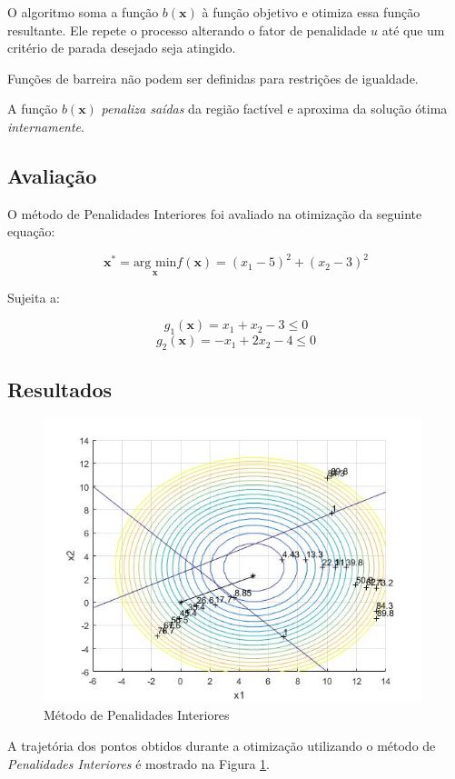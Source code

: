 \documentclass[10pt,a4paper]{article}
\begin{document}
	O algoritmo soma a função $b(\bm{x})$ à função objetivo e otimiza essa função resultante. Ele repete o processo alterando o fator de penalidade $u$ até que um critério de parada desejado seja atingido.

	Funções de barreira não podem ser definidas para restrições de igualdade.

	A função $b(\bm{x})$ \emph{penaliza saídas} da região factível e aproxima da solução ótima \emph{internamente}. 

	\subsection{Avaliação}

	O método de Penalidades Interiores foi avaliado na otimização da seguinte equação:

	$$ \bm{x^*} = \underset{\bm{x}}{\text{arg min}} f(\bm{x}) = (x_1-5)^2+(x_2-3)^2$$

	Sujeita a:

	$$ g_1(\bm{x}) = x_1 + x_2 -3 \le 0 $$ 
	$$ g_2(\bm{x}) = -x_1 + 2x_2 - 4 \le 0 $$ 

	\subsection{Resultados}

	\begin{figure}[h]
		\centering
		\includegraphics[width=11cm]{penalidade_interior}
		\caption{Método de Penalidades Interiores}
		\label{penalidade_interior}
	\end{figure}

	A trajetória dos pontos obtidos durante a otimização utilizando o método de \emph{Penalidades Interiores} é mostrado na Figura \ref{penalidade_interior}.
\end{document}
